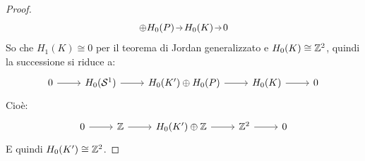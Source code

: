 \begin{proof}
\[\begin{tikzcd}[nodes={column sep=7pt, inner sep = 1.5pt}]
      \oplus H_0(P) \rar & H_0(K) \rar & 0
    \end{tikzcd}
  \]
  So che $ H_1(K) \cong 0 $ per il teorema di Jordan generalizzato e $ H_0(K) \cong \mathbb{Z}^2 $,
  quindi la successione si riduce a:
  \[
    \begin{tikzcd}%
      0 \rar & H_0(\Sph{1}) \rar & H_0(K') \oplus H_0(P) \rar & H_0(K) \rar & 0
    \end{tikzcd}
  \]
  Cioè:
  \[
    \begin{tikzcd}%
      0 \rar & \Z \rar & H_0(K') \oplus \Z \rar & \Z^2 \rar & 0
    \end{tikzcd}
  \]
  E quindi $ H_0(K') \cong \mathbb{Z}^2 $.
\end{proof}

